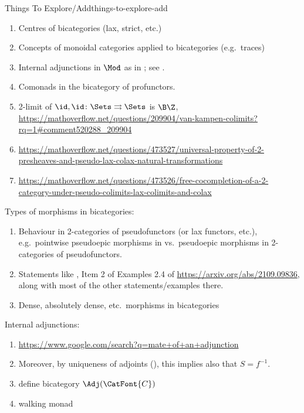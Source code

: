 \begin{remark}{Things To Explore/Add}{things-to-explore-add}
\begin{enumerate}
        \item Centres of bicategories (lax, strict, etc.)
        \item Concepts of monoidal categories applied to bicategories (e.g.\ traces)
        \item Internal adjunctions in $\Mod$ as in \cite[Section 6.3]{2-categories-book}; see \cite[Example 6.2.6]{2-categories-book}.
        \item Comonads in the bicategory of profunctors.
        \item 2-limit of $\id,\id\colon\Sets\rightrightarrows\Sets$ is $\B\Z$, \url{https://mathoverflow.net/questions/209904/van-kampen-colimits?rq=1#comment520288_209904}
        \item \url{https://mathoverflow.net/questions/473527/universal-property-of-2-presheaves-and-pseudo-lax-colax-natural-transformations}
        \item \url{https://mathoverflow.net/questions/473526/free-cocompletion-of-a-2-category-under-pseudo-colimits-lax-colimits-and-colax}
    \end{enumerate}
    Types of morphisms in bicategories:
    \begin{enumerate}
        \item Behaviour in 2-categories of pseudofunctors (or lax functors, etc.), e.g.\ pointwise pseudoepic morphisms in vs.\ pseudoepic morphisms in 2-categories of pseudofunctors.
        \item Statements like , Item 2 of Examples 2.4 of \url{https://arxiv.org/abs/2109.09836}, along with most of the other statements/examples there.
        \item Dense, absolutely dense, etc.\ morphisms in bicategories
    \end{enumerate}
    Internal adjunctions:
    \begin{enumerate}
        \item \url{https://www.google.com/search?q=mate+of+an+adjunction}
        \item Moreover, by uniqueness of adjoints (), this implies also that $S=f^{-1}$.
        \item define bicategory $\Adj(\CatFont{C})$
        \item walking monad

\end{enumerate}
\end{remark}
